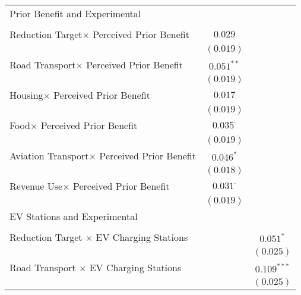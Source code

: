 \begin{center}
\begin{tiny}
\begin{longtable}{l@{} c@{} c@{}}
Prior Benefit and Experimental                           &                 &                \\
                                                         &                 &                \\
\quad Reduction Target$\times$ Perceived Prior Benefit   & $0.029$         &                \\
                                                         & $(0.019)$       &                \\
\quad Road Transport$\times$ Perceived Prior Benefit     & $0.051^{**}$    &                \\
                                                         & $(0.019)$       &                \\
\quad Housing$\times$ Perceived Prior Benefit            & $0.017$         &                \\
                                                         & $(0.019)$       &                \\
\quad Food$\times$ Perceived Prior Benefit               & $0.035^{\cdot}$ &                \\
                                                         & $(0.019)$       &                \\
\quad Aviation Transport$\times$ Perceived Prior Benefit & $0.046^{*}$     &                \\
                                                         & $(0.018)$       &                \\
\quad Revenue Use$\times$ Perceived Prior Benefit        & $0.031^{\cdot}$ &                \\
                                                         & $(0.019)$       &                \\
EV Stations and Experimental                             &                 &                \\
                                                         &                 &                \\
\quad Reduction Target $\times$ EV Charging Stations     &                 & $0.051^{*}$    \\
                                                         &                 & $(0.025)$      \\
\quad Road Transport $\times$ EV Charging Stations       &                 & $0.109^{***}$  \\
                                                         &                 & $(0.025)$      \\

\end{longtable}
\end{tiny}
\end{center}

